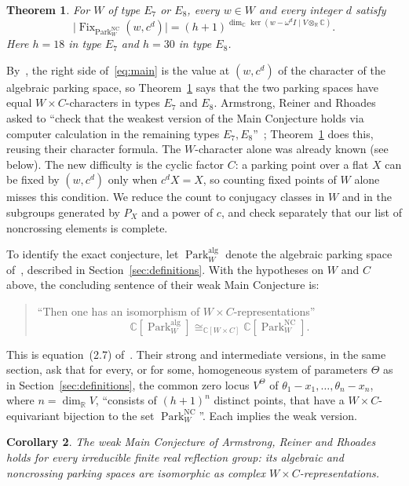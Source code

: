 \documentclass[11pt]{article}
\newtheorem{theorem}{Theorem}[section]
\newtheorem{corollary}[theorem]{Corollary}
\newcommand{\C}{\mathbb C}
\newcommand{\R}{\mathbb R}
\newcommand{\NC}{\operatorname{NC}}
\newcommand{\Fix}{\operatorname{Fix}}
\newcommand{\Park}{\operatorname{Park}}
\begin{document}
\begin{theorem}\label{thm:main}
For $W$ of type $E_7$ or $E_8$, every $w\in W$ and every integer $d$
satisfy
\begin{equation}\label{eq:main}
 \bigl|\Fix_{\Park^{\NC}_W}(w,c^d)\bigr|
       =(h+1)^{\dim_{\C}\ker(w-\omega^d I\mid V\otimes_{\R}\C)}.
\end{equation}
Here $h=18$ in type $E_7$ and $h=30$ in type $E_8$.
\end{theorem}

By~\cite[Proposition~2.15]{ARR}, the right side of~\eqref{eq:main} is
the value at $(w,c^d)$ of the character of the algebraic parking space,
so Theorem~\ref{thm:main} says that the two parking spaces have equal
$W\times C$-characters in types $E_7$ and $E_8$.
Armstrong, Reiner and Rhoades asked to ``check that the weakest version
of the Main Conjecture holds via computer calculation in the remaining
types $E_7, E_8$''~\cite[Problem~11.1]{ARR}; Theorem~\ref{thm:main} does
this, reusing their character formula. The $W$-character alone was
already known (see below). The new difficulty is the cyclic factor $C$:
a parking point over a flat $X$ can be fixed by $(w,c^d)$ only when
$c^dX=X$, so counting fixed points of $W$ alone misses this condition.
We reduce the count to conjugacy classes in $W$ and in the subgroups
generated by $P_X$ and a power of $c$, and check separately that our
list of noncrossing elements is complete.

To identify the exact conjecture, let $\Park^{\mathrm{alg}}_W$ denote
the algebraic parking space of~\cite[Section~2.5]{ARR}, described in
Section~\ref{sec:definitions}. With the hypotheses on $W$ and $C$
above, the concluding sentence of their weak Main Conjecture is:
\begin{quote}
``Then one has an isomorphism of $W\times C$-representations''
\[
 \C[\Park^{\mathrm{alg}}_W]
       \cong_{\C[W\times C]}\C[\Park^{\NC}_W].
\]
\end{quote}
This is equation~(2.7) of~\cite[Section~2.6]{ARR}. Their strong and
intermediate versions, in the same section, ask that for every, or for
some, homogeneous system of parameters $\Theta$ as in
Section~\ref{sec:definitions}, the common zero locus $V^\Theta$ of
$\theta_1-x_1,\ldots,\theta_n-x_n$, where $n=\dim_{\R}V$, ``consists of
$(h+1)^n$ distinct points, that have a $W\times C$-equivariant bijection
to the set $\Park^{\NC}_W$''. Each implies the weak version.

\begin{corollary}\label{cor:all}
The weak Main Conjecture of Armstrong, Reiner and Rhoades holds for
every irreducible finite real reflection group: its algebraic and
noncrossing parking spaces are isomorphic as complex
$W\times C$-representations.
\end{corollary}
\end{document}
